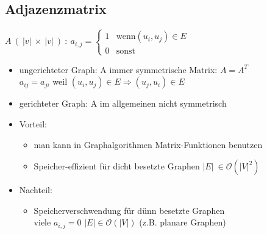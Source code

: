 \documentclass[11pt, fleqn]{scrreprt}
\begin{document}
	\subsection*{Adjazenzmatrix}
	 $ A\  (\ |v|\ \times \ |v|\ )\ :\  a_{i,j} = \begin{cases} 1 & \text{wenn} (u_i, u_j) \in E \\
	0  & \text{sonst}\end{cases}$
	\begin{itemize}
		\item ungerichteter Graph: A immer symmetrische Matrix: $A = A^T$ \\
		\hspace*{1cm} $a_{ij} = a_{ji}$ \hspace*{2mm} weil \hspace*{2mm} $(u_i, u_j) \in E \Rightarrow (u_j, u_i) \in E$
		\item gerichteter Graph: A im allgemeinen nicht symmetrisch
		\item Vorteil:
		\begin{itemize}
			\item man kann in Graphalgorithmen Matrix-Funktionen benutzen
			\item Speicher-effizient für dicht besetzte Graphen $| E | \ \in \mathcal{O}(|V|^2)$
		\end{itemize}
		\item Nachteil:
		\begin{itemize}
			\item Speicherverschwendung für dünn besetzte Graphen \\
			viele $a_{i,j} = 0$ \hspace*{1cm} $|E| \in \mathcal{O}(|V|)$ \hspace*{1cm} (z.B. planare Graphen)
		\end{itemize}
	\end{itemize}
\end{document}
